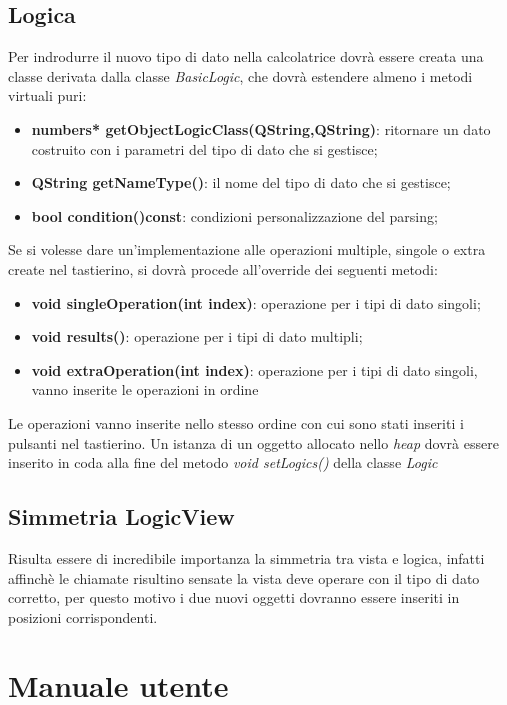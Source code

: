 \documentclass[a4paper,10pt]{article}
\begin{document}
        \subsection{Logica}
        Per indrodurre il nuovo tipo di dato nella calcolatrice dovrà essere creata una classe derivata dalla classe \textit{BasicLogic}, che dovrà estendere almeno i metodi virtuali puri:
        \begin{itemize}
            \item \textbf{numbers* getObjectLogicClass(QString,QString)}: ritornare un dato costruito con i parametri del tipo di dato che si gestisce; 
            \item \textbf{QString getNameType()}: il nome del tipo di dato che si gestisce;
            \item \textbf{bool condition()const}: condizioni personalizzazione del parsing;
        \end{itemize}
        Se si volesse dare un'implementazione alle operazioni multiple, singole o extra create nel tastierino, si dovrà procede all'override dei seguenti metodi:
        \begin{itemize}
            \item \textbf{void singleOperation(int index)}: operazione per i tipi di dato singoli;
            \item \textbf{void results()}: operazione per i tipi di dato multipli;
            \item \textbf{void extraOperation(int index)}: operazione per i tipi di dato singoli, vanno inserite le operazioni in ordine 
        \end{itemize}
        Le operazioni vanno inserite nello stesso ordine con cui sono stati inseriti i pulsanti nel tastierino.
        Un istanza di un oggetto allocato nello \textit{heap} dovrà essere inserito in coda alla fine del metodo \textit{void setLogics()} della classe \textit{Logic}
        \subsection{Simmetria Logic\-View}
        Risulta essere di incredibile importanza la simmetria tra vista e logica, infatti affinchè le chiamate risultino sensate la vista deve operare con il tipo di dato corretto, per questo motivo i due nuovi oggetti dovranno essere inseriti in posizioni corrispondenti.
            
            \section{Manuale utente}
\end{document}
